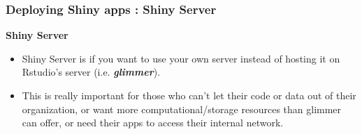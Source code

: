 \documentclass{beamer}
\begin{document}
\begin{frame}
\frametitle{Deploying Shiny apps : Shiny Server}
\Large
\textbf{Shiny Server}
\begin{itemize}


\item Shiny Server is if you want to use your own server instead of hosting it on Rstudio's server (i.e. \textbf{\textit{glimmer}}). 

\item  This is really important for those who can't let their code or data out of their organization, 
or want more computational/storage resources than glimmer can offer, or need their apps to access their 
internal network.
\end{itemize}
\end{frame}
\end{document}
